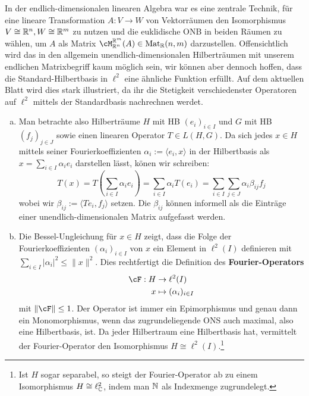 In der endlich-dimensionalen linearen Algebra war es eine zentrale Technik, für eine lineare Transformation $A: V \to W$ von Vektorräumen den Isomorphismus $V \cong \mathbb{R}^n, W \cong \mathbb{R}^m$ zu nutzen und die euklidische ONB in beiden Räumen zu wählen, um $A$ als Matrix $\cM_{\R^n}^{\R^m} (A) \in \text{Mat}_\R(n,m)$ darzustellen. Offensichtlich wird das in den allgemein unendlich-dimensionalen Hilberträumen mit unserem endlichen Matrixbegriff kaum möglich sein, wir können aber dennoch hoffen, dass die Standard-Hilbertbasis in $\ell^2$ eine ähnliche Funktion erfüllt. Auf dem aktuellen Blatt wird dies stark illustriert, da ihr die Stetigkeit verschiedenster Operatoren auf $\ell^2$ mittels der Standardbasis nachrechnen werdet. \\
\begin{bemerkung}
    \begin{enumerate}[(a)]
        \item Man betrachte also Hilberträume $H$ mit HB $(e_i)_{i \in I}$ und $G$ mit HB $(f_j)_{j \in J}$ sowie einen linearen Operator $T \in L(H,G)$. Da sich jedes $x \in H$ mittels seiner Fourierkoeffizienten $\alpha_i := \langle e_i, x \rangle$ in der Hilbertbasis als $x = \sum_{i \in I} \alpha_i e_i$ darstellen lässt, könen wir schreiben:
    \begin{equation}
        T(x) = T \left(\sum_{i \in I} \alpha_i e_i \right) = \sum_{i \in I} \alpha_i T(e_i) = \sum_{i \in I} \sum_{j \in J} \alpha_i \beta_{ij} f_j
    \end{equation}
wobei wir $\beta_{ij}:= \langle Te_i, f_j \rangle$ setzen. Die $\beta_{ij}$ können informell als die Einträge einer unendlich-dimensionalen Matrix aufgefasst werden.
\item Die Bessel-Ungleichung für $x \in H$ zeigt, dass die Folge der Fourierkoeffizienten $(\alpha_i)_{i \in I}$ von $x$ ein Element in $\ell^2(I)$ definieren mit $\sum_{i \in I} |\alpha_i|^2 \leq \|x\|^2$. Dies rechtfertigt die Definition des \textbf{Fourier-Operators}
    \begin{align}
        \cF: H &\to \ell^2(I)\\
        x &\mapsto (\alpha_i)_{i \in I}
    \end{align}
mit $\|\cF\|\leq 1$. Der Operator ist immer ein Epimorphismus und genau dann ein Monomorphismus, wenn das zugrundeliegende ONS auch maximal, also eine Hilbertbasis, ist. Da jeder Hilbertraum eine Hilbertbasis hat, vermittelt der Fourier-Operator den Isomorphismus $H \cong \ell^2(I)$.\footnote{Ist $H$ sogar separabel, so steigt der Fourier-Operator ab zu einem Isomorphismus $H \cong \ell^2_{\mathbb{C}}$, indem man $\mathbb{N}$ als Indexmenge zugrundelegt.} 

\end{enumerate}
\end{bemerkung}
